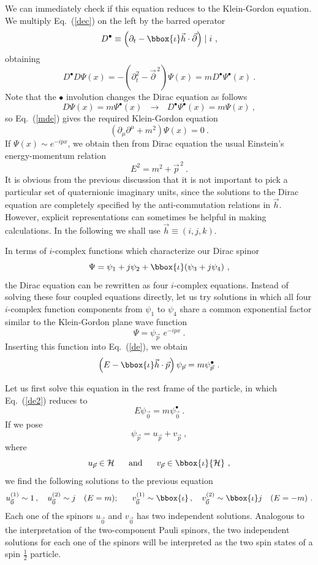 We can immediately check if this equation reduces to the Klein-Gordon equation.
We multiply Eq.~(\ref{dec}) on the left by the barred operator
\[ 
D^{\bullet} \equiv 
\left( \partial_t  - \bbox{\iota} \vec{h} \cdot \vec{\partial} \right) \mid i~,
\]
obtaining
\begin{equation}
\label{mde}
D^{\bullet} D \Psi(x) = 
- \left( \partial_t^2  - \vec{\partial}^{\, 2} \right) \Psi(x) = 
m D^{\bullet} \Psi^{\bullet}(x)~.
\end{equation}
Note that the $\bullet$ involution changes the Dirac equation as follows
\[
D \Psi(x)  = m \Psi^{\bullet}(x) ~~~\rightarrow~~~
D^{\bullet} \Psi^{\bullet}(x)  = m \Psi(x)~,
\]
so Eq.~(\ref{mde}) gives the required Klein-Gordon equation
\[ \left( \partial_{\mu} \partial^{\mu} + m^2 \right) \Psi(x) = 0 ~. \]
If $\Psi(x) \sim e^{-ipx}$, we obtain then from Dirac equation the usual 
Einstein's energy-momentum relation
\[ E^2 = m^2 + \vec{p}^{\, 2}~. \]
It is obvious from the previous discussion that it is not important to pick 
a particular set of quaternionic imaginary units, since the solutions to the 
Dirac equation are completely specified by the anti-commutation relations in 
$\vec{h}$. However, explicit representations can sometimes be helpful in 
making calculations. In the following we shall use $\vec{h}\equiv (i,j,k)$.

In terms of $i$-complex functions which characterize our Dirac spinor
\[ 
\Psi = \psi_1 + j \psi_2 + \bbox{\iota} (\psi_3 + j \psi_4)~,
\]
the Dirac equation can be rewritten as four $i$-complex equations. Instead of
solving these four coupled equations directly, let us try solutions in which 
all four $i$-complex function components from $\psi_1$ to $\psi_4$ share a 
common exponential factor similar to the Klein-Gordon plane wave function
\[ \Psi = \psi_{\vec{p}} \, \,  e^{-ipx}~.\]
Inserting this function into Eq.~(\ref{de}), we obtain
\begin{equation}
\label{de2}
\left( E - \bbox{\iota} \vec{h} \cdot \vec{p} \right) \psi_{\vec{p}}
= m \psi^{\bullet}_{\vec{p}}~.
\end{equation}

Let us first solve this equation in the rest frame of the particle, in which
Eq.~(\ref{de2}) reduces to 
\[ E \psi_{\vec{0}} = m \psi^{\bullet}_{\vec{0}}~. \]
If we pose
\[ \psi_{\vec{p}} = u_{\vec{p}} + v_{\vec{p}}~, \]
where
\[ u_{\vec{p}} \in {\cal H} ~~~~~\mbox{and}~~~~~            
   v_{\vec{p}} \in \bbox{\iota}{\cal H}~,\]
we find the following solutions to the previous equation 
\[ 
u^{(1)}_{\vec{0}}\sim 1 \, ,~~~u^{(2)}_{\vec{0}}\sim j ~~~(E=m);~~~~~
v^{(1)}_{\vec{0}}\sim \bbox{\iota} \, ,~~~
v^{(2)}_{\vec{0}}\sim \bbox{\iota} j ~~~(E=-m)
~.\]
Each one of the spinors $u_{\vec{0}}$ and $v_{\vec{0}}$ has two independent 
solutions. Analogous to
the interpretation of the two-component Pauli spinors, the two independent 
solutions for each one of the spinors will be 
interpreted as the two spin states of a 
spin $\frac{1}{2}$ particle.

